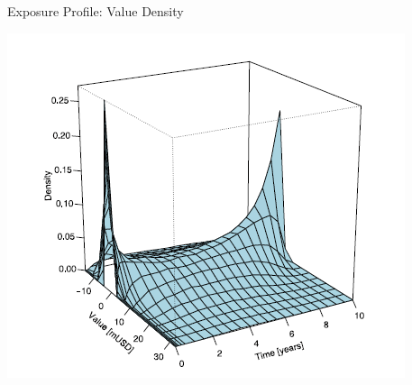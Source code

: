 \documentclass[11pt]{beamer}
\begin{document}
\begin{frame}{Exposure Profile: Value Density}
\begin{center}
\includegraphics[scale=.8]{img/profilo_3.png} 
\end{center}
\end{frame}
\end{document}
